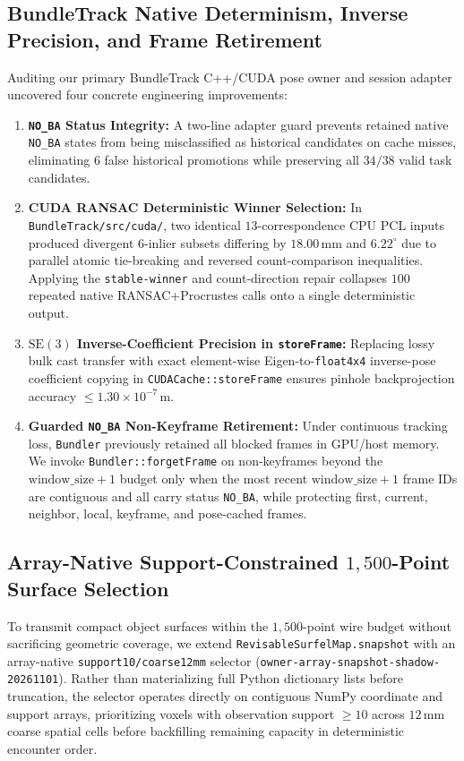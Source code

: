 \documentclass[10pt,journal]{IEEEtran}
\begin{document}
\subsection{BundleTrack Native Determinism, Inverse Precision, and Frame Retirement}
\label{sec:native_bt}
Auditing our primary BundleTrack C++/CUDA pose owner and session adapter uncovered four concrete engineering improvements:
\begin{enumerate}
    \item \textbf{\texttt{NO\_BA} Status Integrity:} A two-line adapter guard prevents retained native \texttt{NO\_BA} states from being misclassified as historical candidates on cache misses, eliminating $6$ false historical promotions while preserving all $34/38$ valid task candidates.
    \item \textbf{CUDA RANSAC Deterministic Winner Selection:} In \texttt{BundleTrack/src/cuda/}, two identical $13$-correspondence CPU PCL inputs produced divergent $6$-inlier subsets differing by $18.00\,\mathrm{mm}$ and $6.22^\circ$ due to parallel atomic tie-breaking and reversed count-comparison inequalities. Applying the \texttt{stable-winner} and count-direction repair collapses $100$ repeated native RANSAC+Procrustes calls onto a single deterministic output.
    \item \textbf{$\mathrm{SE}(3)$ Inverse-Coefficient Precision in \texttt{storeFrame}:} Replacing lossy bulk cast transfer with exact element-wise Eigen-to-\texttt{float4x4} inverse-pose coefficient copying in \texttt{CUDACache::storeFrame} ensures pinhole backprojection accuracy $\le 1.30\times 10^{-7}\,\mathrm{m}$.
    \item \textbf{Guarded \texttt{NO\_BA} Non-Keyframe Retirement:} Under continuous tracking loss, \texttt{Bundler} previously retained all blocked frames in GPU/host memory. We invoke \texttt{Bundler::forgetFrame} on non-keyframes beyond the $\text{window\_size}+1$ budget only when the most recent $\text{window\_size}+1$ frame IDs are contiguous and all carry status \texttt{NO\_BA}, while protecting first, current, neighbor, local, keyframe, and pose-cached frames.
\end{enumerate}

\subsection{Array-Native Support-Constrained $1{,}500$-Point Surface Selection}
\label{sec:surface_selection}
To transmit compact object surfaces within the $1{,}500$-point wire budget without sacrificing geometric coverage, we extend \texttt{RevisableSurfelMap.snapshot} with an array-native \texttt{support10/coarse12mm} selector (\texttt{owner-array-snapshot-shadow-20261101}). Rather than materializing full Python dictionary lists before truncation, the selector operates directly on contiguous NumPy coordinate and support arrays, prioritizing voxels with observation support $\ge 10$ across $12\,\mathrm{mm}$ coarse spatial cells before backfilling remaining capacity in deterministic encounter order.
\end{document}
